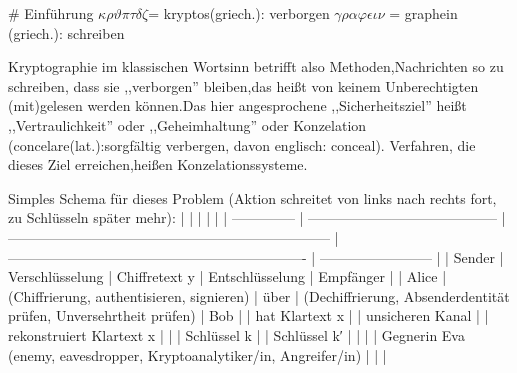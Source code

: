 \documentclass[a4paper]{article}
\begin{document}
\raggedright
\begin{multicols}{3}\scriptsize
    \setlength{\premulticols}{1pt}
    \setlength{\postmulticols}{1pt}
    \setlength{\multicolsep}{1pt}
    \setlength{\columnsep}{2pt}

    # Einführung
    $\kappa\rho\vartheta\pi\tau\delta\zeta$= kryptos(griech.): verborgen
    $\gamma\rho\alpha\varphi\epsilon\iota\nu$ = graphein (griech.): schreiben

    Kryptographie im klassischen Wortsinn betrifft also Methoden,Nachrichten so zu schreiben, dass sie ,,verborgen'' bleiben,das heißt von keinem Unberechtigten (mit)gelesen werden können.Das hier angesprochene ,,Sicherheitsziel'' heißt ,,Vertraulichkeit'' oder ,,Geheimhaltung'' oder Konzelation (concelare(lat.):sorgfältig verbergen, davon englisch: conceal). Verfahren, die dieses Ziel erreichen,heißen Konzelationssysteme.

    Simples Schema für dieses Problem (Aktion schreitet von links nach rechts fort, zu Schlüsseln später mehr):
    |                |                                           |                                                                       |                                                                  |
    | -------------- | ----------------------------------------- | --------------------------------------------------------------------- | ---------------------------------------------------------------- | ------------------------ |
    | Sender         | Verschlüsselung                           | Chiffretext y                                                         | Entschlüsselung                                                  | Empfänger                |
    | Alice          | (Chiffrierung, authentisieren, signieren) | über                                                                  | (Dechiffrierung, Absenderdentität prüfen, Unversehrtheit prüfen) | Bob                      |
    | hat Klartext x |                                           | unsicheren Kanal                                                      |                                                                  | rekonstruiert Klartext x |
    |                | Schlüssel k                               |                                                                       | Schlüssel k′                                                     |
    |                |                                           | Gegnerin Eva (enemy, eavesdropper, Kryptoanalytiker/in, Angreifer/in) |                                                                  |                          |


\end{multicols}
\end{document}
